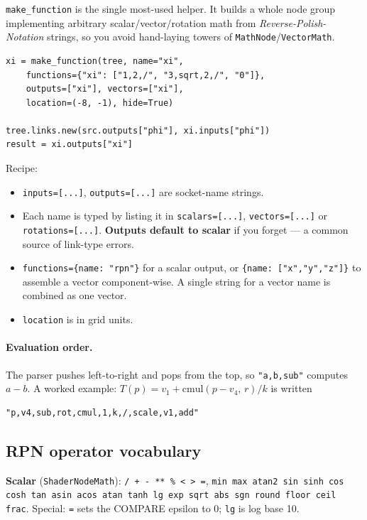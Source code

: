 \documentclass[10pt,a4paper,twocolumn]{article}
\newcommand{\code}[1]{\texttt{\small #1}}
\begin{document}
\code{make\_function} is the single most-used helper. It builds a whole
node group implementing arbitrary scalar/vector/rotation math from
\emph{Reverse-Polish-Notation} strings, so you avoid hand-laying towers
of \code{MathNode}/\code{VectorMath}.

\begin{lstlisting}
xi = make_function(tree, name="xi",
    functions={"xi": ["1,2,/", "3,sqrt,2,/", "0"]},
    outputs=["xi"], vectors=["xi"],
    location=(-8, -1), hide=True)

tree.links.new(src.outputs["phi"], xi.inputs["phi"])
result = xi.outputs["xi"]
\end{lstlisting}

Recipe:
\begin{itemize}[leftmargin=12pt,itemsep=1pt]
\item \code{inputs=[...]}, \code{outputs=[...]} are socket-name strings.
\item Each name is typed by listing it in \code{scalars=[...]},
  \code{vectors=[...]} or \code{rotations=[...]}. \textbf{Outputs default
  to scalar} if you forget --- a common source of link-type errors.
\item \code{functions=\{name: "rpn"\}} for a scalar output, or
  \code{\{name: ["x","y","z"]\}} to assemble a vector component-wise. A
  single string for a vector name is combined as one vector.
\item \code{location} is in grid units.
\end{itemize}

\paragraph{Evaluation order.} The parser pushes left-to-right and pops
from the top, so \code{"a,b,sub"} computes $a-b$. A worked example:
$T(p)=v_1+\mathrm{cmul}(p-v_4,\,r)/k$ is written

\begin{lstlisting}
"p,v4,sub,rot,cmul,1,k,/,scale,v1,add"
\end{lstlisting}

\subsection{RPN operator vocabulary}

\textbf{Scalar} (\code{ShaderNodeMath}):
\code{* / + - ** \% < > =}, \code{min max atan2 sin sinh cos cosh tan asin
acos atan tanh lg exp sqrt abs sgn round floor ceil frac}. Special:
\code{=} sets the COMPARE epsilon to 0; \code{lg} is log base 10.
\end{document}
